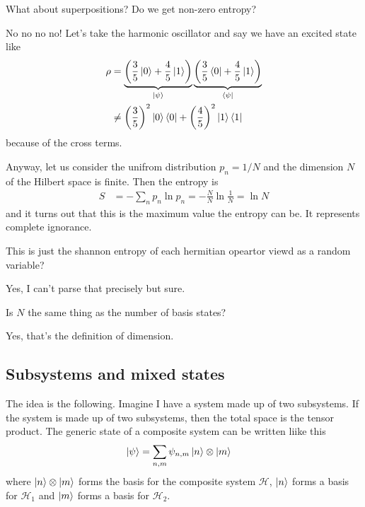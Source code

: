 \begin{question}
    What about superpositions?
    Do we get non-zero entropy?
\end{question}
No no no no!
Let's take the harmonic oscillator
and say we have an excited state like
\begin{align}
    \rho &=
    \underbrace{\left( \frac{3}{5}\ket{0} + \frac{4}{5}\ket{1} \right)}_{%
        \ket{\psi}
    }
    \underbrace{\left( \frac{3}{5}\bra{0} + \frac{4}{5}\ket{1} \right)}_{%
        \bra{\psi}
    }\\
    &\ne \left( \frac{3}{5} \right)^2 \ket{0}\bra{0}
    + \left( \frac{4}{5} \right)^2 \ket{1}\bra{1}
\end{align}
because of the cross terms.

Anyway,
let us consider the unifrom distribution
$p_n=1/N$
and the dimension $N$ of the Hilbert space is finite.
Then the entropy is
\begin{align}
    S &= -\sum_n p_n\ln p_n
    = -\frac{N}{N}\ln \frac{1}{N} = \ln N
\end{align}
and it turns out that this is the maximum value the entropy can be.
It represents complete ignorance.

\begin{question}
    This is just the shannon entropy of each hermitian opeartor viewd as a
    random variable?
\end{question}
Yes, I can't parse that precisely but sure.

\begin{question}
    Is $N$ the same thing as the number of basis states?
\end{question}
Yes, that's the definition of dimension.

\subsection{Subsystems and mixed states}
The idea is the following.
Imagine I have a system made up of two subsystems.
If the system is made up of two subsystems,
then the total space is the tensor product.
The generic state of a composite system can be written liike this
\begin{align}
    \ket{\psi} &=
    \sum_{n,m} \psi_{n,m}
    \ket{n}\otimes\ket{m}
\end{align}
where $\ket{n}\otimes\ket{m}$ forms the basis for the composite system
$\mathcal{H}$,
$\ket{n}$ forms a basis for $\mathcal{H}_1$ and
$\ket{m}$ forms a basis for $\mathcal{H}_2$.

